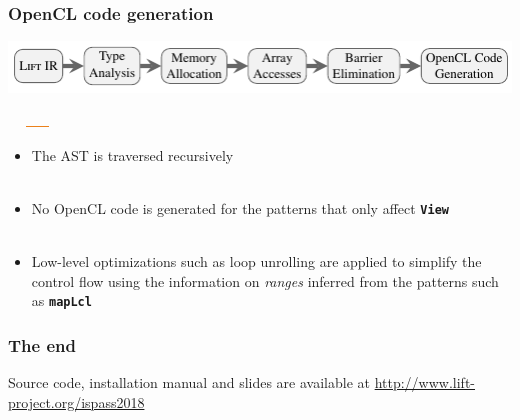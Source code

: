 \documentclass[10pt,usetotalslideindicator]{beamer}
\newcommand{\code}[1]{\textbf{\texttt{#1}}}
\begin{document}
\begin{frame}[t]
\frametitle{OpenCL code generation}
    \vspace{-1cm}
    \begin{block}{}
        \begin{center}
            \includegraphics[width=1\textwidth]{../images/compilation_stages.pdf}
        \end{center}
        \vspace{-1.05cm}
        \hspace{8.9cm}
        \includegraphics[width=1.57cm, height=0.03cm]{../images/orange_bar.png}
        \vspace{.45cm}
    \end{block}
    \vspace{-0.5cm}
\begin{itemize}
	\item The AST is traversed recursively\\
	\
	\item No OpenCL code is generated for the patterns that only affect \code{View}\\
	\
	\item Low-level optimizations such as loop unrolling are applied to simplify the control flow using the information on \textit{ranges} inferred from the patterns such as \code{mapLcl}
\end{itemize}
\end{frame}

\begin{frame}
\frametitle{The end}
\begin{center}
Source code, installation manual and slides are available at
\textcolor{blue}{\url{http://www.lift-project.org/ispass2018}}
\end{center}
\end{frame}
\end{document}
